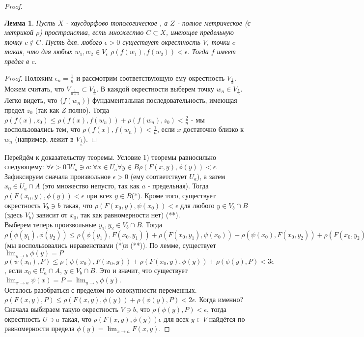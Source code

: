 \documentclass[a4paper]{article}
\theoremstyle{indented}
\newtheorem{lemma}{Лемма}
\theoremstyle{definition}
\theoremstyle{remark}
\DeclareMathOperator{\ra}{\rightarrow}
\begin{document}
\begin{proof}
    \begin{lemma}
    Пусть $X$ - хаусдорфово топологическое , а $Z$ - полное метрическое (с метрикой $\rho$) пространства, есть множество $C \subset X$, имеющее предельную точку $c \notin C$. Пусть для. любого $\epsilon > 0$ существует окрестность $V_{\epsilon}$ точки $c$ такая, что для любых $w_1, w_2 \in V_{\epsilon}$ $\rho(f(w_1), f(w_2)) < \epsilon$. Тогда $f$ имеет предел в $c$.
    \end{lemma}
    \begin{proof}
    Положим $\epsilon_n=\frac{1}{n}$ и рассмотрим соответствующую ему окрестность $V_{\frac{1}{n}}$. Можем считать, что $V_{\frac{1}{n+1}} \subset V_{\frac{1}{n}}$. В каждой окрестности выберем точку $w_n \in V_{\frac{!}{n}}$. Легко видеть, что $\{f(w_n)\}$ фундаментальная последовательность, имеющая предел $z_0$ (так как $Z$ полно). Тогда $\rho(f(x), z_0) \leq \rho(f(x), f(w_n))+\rho(f(w_n), z_0) < \frac{2}{n}$ - мы воспользовались тем, что $\rho(f(x), f(w_n))<\frac{1}{n}$, если $x$ достаточно близко к $w_n$ (например, лежит в $V_{\frac{1}{n}}$). 
    \end{proof}
    Перейдём к доказательству теоремы. Условие 1) теоремы равносильно следующему: $\forall \epsilon > 0 \exists U_a \ni a : \forall x \in U_a \forall y \in B \rho(F(x, y), \phi(y)) < \epsilon$.
    Зафиксируем сначала произвольное $\epsilon > 0$ (ему соответствует $U_a$), а затем $x_0 \in U_a \cap A$ (это множество непусто, так как $a$ - предельная). Тогда $\rho(F(x_0, y), \phi(y)) < \epsilon$ при всех $y \in B$(*). Кроме того, существует окрестность $V_b \ni b$ такая, что $\rho(F(x_0, y), \psi(x_0))< \epsilon$ для любого $y \in V_b \cap B$ (здесь $V_b$) зависит от $x_0$, так как равномерности нет) (**).
    \\
    Выберем теперь произвольные $y_1, y_2 \in V_b \cap B$. Тогда $\rho(\phi(y_1), \phi(y_2)) \leq \rho(\phi(y_1), F(x_0, y_1))+\rho(F(x_0, y_1), \psi(x_0))+\rho(\psi(x_0), F(x_0, y_2))+\rho(F(x_0, y_2), \phi(y_2)) < 4\epsilon$ (мы воспользовались неравенствами (*)и (**)). По лемме, существует $\lim_{y \ra b} \phi(y)=P$
    \\
    $\rho(\psi(x_0), P) \leq \rho(\psi(x_0), F(x_0, y))+\rho(F(x_0, y), \phi(y))+\rho(\phi(y), P) < 3\epsilon$, если $x_0 \in U_a \cap A$, $y \in V_b \cap B$. Это и значит, что существует $\lim_{x \ra a} \psi(x)=P=\lim_{y \ra b} \phi(y)$.
    \\
    Осталось разобраться с пределом по совокупности переменных. $\rho(F(x, y), P) \leq \rho(F(x, y), \phi(y))+\rho(\phi(y), P) <2\epsilon$. Когда именно? Сначала выбираем такую окрестность $V \ni b$, что $\rho(\phi(y), P) <\epsilon$, тогда окрестность $U \ni a$ такая, что $\rho(F(x, y), \phi(y)) \epsilon$ для всех $y \in V$ найдётся по равномерности предела $\phi(y)=\lim_{x \ra a} F(x, y)$.
\end{proof}
\end{document}

